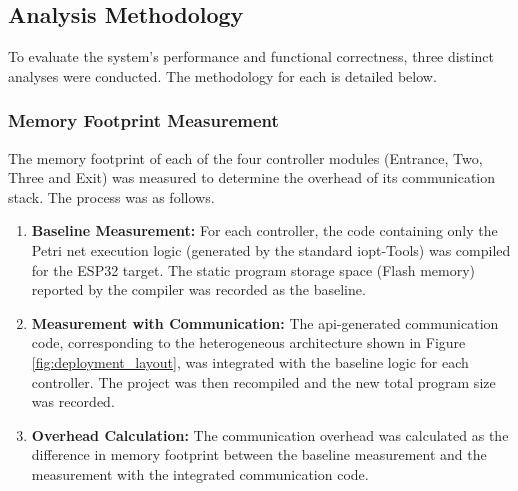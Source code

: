 \subsection{Analysis Methodology}
\label{subsec:analysis_methodology}

To evaluate the system's performance and functional correctness, three distinct analyses were conducted. The methodology for each is detailed below.

\subsubsection{Memory Footprint Measurement}
\label{subsubsec:memory_methodology}

The memory footprint of each of the four controller modules (Entrance, Two, Three and Exit) was measured to determine the overhead of its communication stack. The process was as follows.
\begin{enumerate}
    \item \textbf{Baseline Measurement:} For each controller, the code containing only the Petri net execution logic (generated by the standard \gls{iopt}-Tools) was compiled for the ESP32 target. The static program storage space (Flash memory) reported by the compiler was recorded as the baseline.
    \item \textbf{Measurement with Communication:} The \gls{api}-generated communication code, corresponding to the heterogeneous architecture shown in Figure \ref{fig:deployment_layout}, was integrated with the baseline logic for each controller. The project was then recompiled and the new total program size was recorded.
    \item \textbf{Overhead Calculation:} The communication overhead was calculated as the difference in memory footprint between the baseline measurement and the measurement with the integrated communication code.
\end{enumerate}

